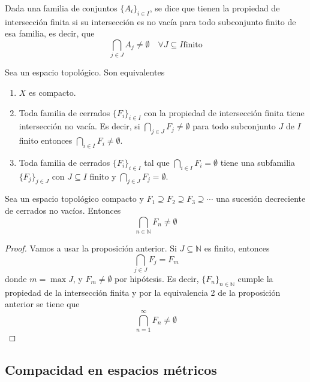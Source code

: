 \documentclass{apuntes}
\begin{document}
\begin{defn} Dada una familia de conjuntos $\{A_i\}_{i∈I}$, se dice que tienen la propiedad de intersección finita si su intersección es no vacía para todo subconjunto finito de esa familia, es decir, que \[ \bigcap_{j∈J} A_j ≠ ∅ \quad ∀J⊆I \text{finito} \]

\end{defn}

\begin{prop} Sea \tops un espacio topológico. Son equivalentes
\begin{enumerate}
	\item $X$ es compacto.
	\item Toda familia de cerrados $\{F_i\}_{i∈I}$ con la propiedad de intersección finita tiene intersección no vacía. Es decir, si $\bigcap_{j∈J} F_j ≠  ∅$ para todo subconjunto $J$ de $I$ finito entonces $\bigcap_{i∈I} F_i ≠ ∅$.
	\item Toda familia de cerrados $\{F_i\}_{i∈I}$ tal que $\bigcap_{i∈I} F_i = ∅$ tiene una subfamilia $\{F_j\}_{j∈J}$ con $J⊆I$ finito y $\bigcap_{j∈J}F_j = ∅$.
\end{enumerate}
\end{prop}

\begin{corol} Sea \tops un espacio topológico compacto y $F_1 ⊇ F_2 ⊇ F_3 ⊇ \dotsb$ una sucesión decreciente de cerrados no vacíos. Entonces \[ \bigcap_{n∈ℕ} F_n ≠ ∅\]
\end{corol}

\begin{proof}
Vamos a usar la proposición anterior. Si $J⊆ℕ$ es finito, entonces  \[ \bigcap_{j∈J} F_j = F_m\] donde $m = \max J$, y $F_m ≠∅$ por hipótesis. Es decir, $\{F_n\}_{n∈ℕ}$ cumple la propiedad de la intersección finita y por la equivalencia 2 de la proposición anterior se tiene que \[ \bigcap_{n=1}^∞ F_n ≠ ∅\]
\end{proof}

\subsection{Compacidad en espacios métricos}
\end{document}
